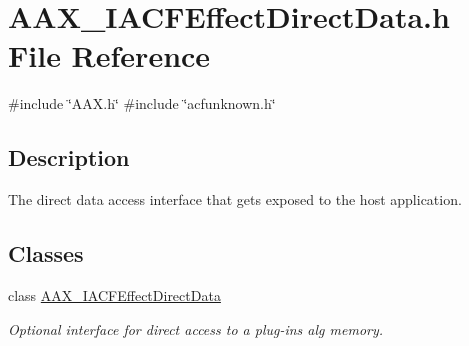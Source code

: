 \hypertarget{a00524}{}\section{A\+A\+X\+\_\+\+I\+A\+C\+F\+Effect\+Direct\+Data.\+h File Reference}
\label{a00524}
{\ttfamily \#include \char`\"{}A\+A\+X.\+h\char`\"{}}\newline
{\ttfamily \#include \char`\"{}acfunknown.\+h\char`\"{}}\newline


\subsection{Description}
The direct data access interface that gets exposed to the host application. 

\subsection*{Classes}
\begin{DoxyCompactItemize}
\item 
class \mbox{\hyperlink{a01661}{A\+A\+X\+\_\+\+I\+A\+C\+F\+Effect\+Direct\+Data}}
\begin{DoxyCompactList}\small\item\em Optional interface for direct access to a plug-\/in\textquotesingle{}s alg memory. \end{DoxyCompactList}\end{DoxyCompactItemize}
